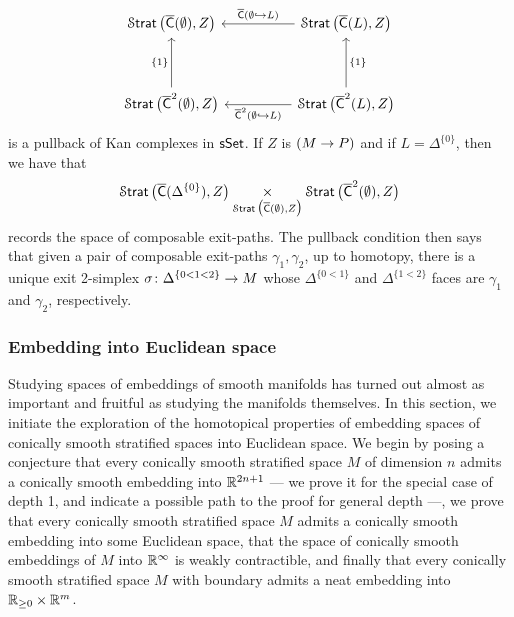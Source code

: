\begin{observation}
\begin{equation}
    \label{ch4:: eq: exit-paths compose}
    \begin{tikzcd}
        {\Strat\big(\overline{\sC}(\emptyset),Z\big)} && {\Strat\big(\overline{\sC}(L),Z\big)} \\
        \\
        {\Strat\big(\overline{\sC}^2(\emptyset),Z\big)} && {\Strat\big(\overline{\sC}^2(L),Z\big)}
        \arrow["{\overline{\sC}(\emptyset \hookra L)}"', from=1-3, to=1-1]
        \arrow["{\{1\}}", from=3-1, to=1-1]
        \arrow["{\{1\}}"', from=3-3, to=1-3]
        \arrow["{\overline{\sC}^2(\emptyset \hookra L)}", from=3-3, to=3-1]
    \end{tikzcd}
\end{equation}
is a pullback of Kan complexes in $\operatorname{\sf sSet}$. If $Z$ is $(M\rightarrow P)$ and if $L=\Delta^{\{0\}}$, then we have that 
\begin{equation}
     \operatorname{\mathcal S\mathsf{trat}}\big(\overline{\mathsf C}(\Delta^{\{0\}}),Z\big)\underset{\operatorname{\mathcal S\mathsf{trat}}\big(\overline{\mathsf C}(\emptyset),Z\big)}{\times} \operatorname{\mathcal S\mathsf{trat}}\big(\overline{\mathsf C}^2(\emptyset),Z\big)
\end{equation}
records the space of composable exit-paths. The pullback condition then says that given a pair of composable exit-paths $\gamma_1,\gamma_2$, up to homotopy, there is a unique exit 2-simplex $\sigma\colon \Delta^{\{0<1<2\}} \rightarrow M$ whose $\Delta^{\{0<1\}}$ and $\Delta^{\{1<2\}}$ faces are $\gamma_1$ and $\gamma_2$, respectively.
\end{observation}



\subsubsection{Embedding into Euclidean space}

Studying spaces of embeddings of smooth manifolds has turned out almost as important and fruitful as studying the manifolds themselves. In this section, we initiate the exploration of the homotopical properties of embedding spaces of conically smooth stratified spaces into Euclidean space. We begin by posing a conjecture that every conically smooth stratified space $M$ of dimension $n$ admits a conically smooth embedding into $\mathbb R^{2n + 1}$ — we prove it for the special case of depth 1, and indicate a possible path to the proof for general depth —, we prove that every conically smooth stratified space $M$ admits a conically smooth embedding into some Euclidean space, that the space of conically smooth embeddings of $M$ into $\mathbb R^{\operatorname{\infty}}$ is weakly contractible, and finally that every conically smooth stratified space $M$ with boundary admits a neat embedding into $\mathbb R_{\geq 0} \times \mathbb R^{m}$.  

